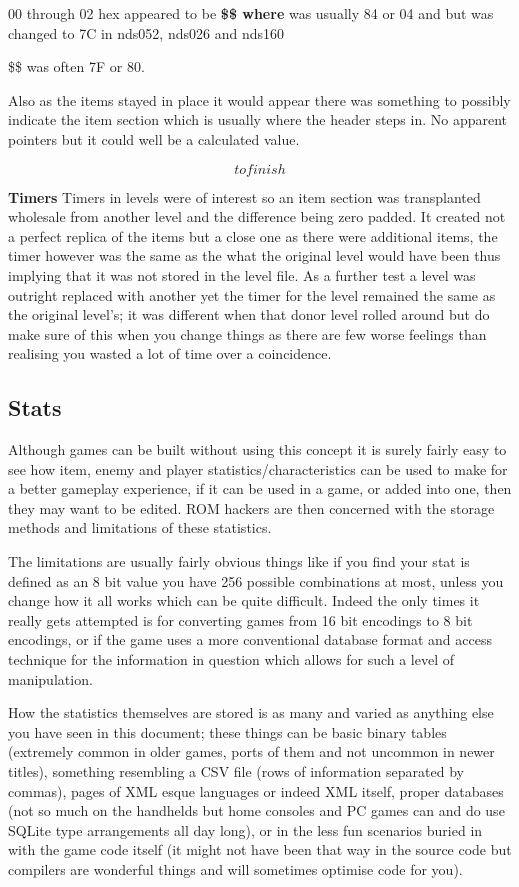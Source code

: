 \documentclass[
]{book}
\begin{document}
00 through 02 hex appeared to be \textbf{\$\$ where } was usually 84 or 04 and but was changed to 7C in nds052, nds026 and nds160

\$\$ was often 7F or 80.

Also as the items stayed in place it would appear there was something to possibly indicate the item section which is usually where the header steps in. No apparent pointers but it could well be a calculated value.

\[to finish\]

\textbf{Timers} Timers in levels were of interest so an item section was transplanted wholesale from another level and the difference being zero padded. It created not a perfect replica of the items but a close one as there were additional items, the timer however was the same as the what the original level would have been thus implying that it was not stored in the level file. As a further test a level was outright replaced with another yet the timer for the level remained the same as the original level's; it was different when that donor level rolled around but do make sure of this when you change things as there are few worse feelings than realising you wasted a lot of time over a coincidence.

\hypertarget{stats}{%
\subsection{Stats}\label{stats}}

Although games can be built without using this concept it is surely fairly easy to see how item, enemy and player statistics/characteristics can be used to make for a better gameplay experience, if it can be used in a game, or added into one, then they may want to be edited. ROM hackers are then concerned with the storage methods and limitations of these statistics.

The limitations are usually fairly obvious things like if you find your stat is defined as an 8 bit value you have 256 possible combinations at most, unless you change how it all works which can be quite difficult. Indeed the only times it really gets attempted is for converting games from 16 bit encodings to 8 bit encodings, or if the game uses a more conventional database format and access technique for the information in question which allows for such a level of manipulation.

How the statistics themselves are stored is as many and varied as anything else you have seen in this document; these things can be basic binary tables (extremely common in older games, ports of them and not uncommon in newer titles), something resembling a CSV file (rows of information separated by commas), pages of XML esque languages or indeed XML itself, proper databases (not so much on the handhelds but home consoles and PC games can and do use SQLite type arrangements all day long), or in the less fun scenarios buried in with the game code itself (it might not have been that way in the source code but compilers are wonderful things and will sometimes optimise code for you).
\end{document}
